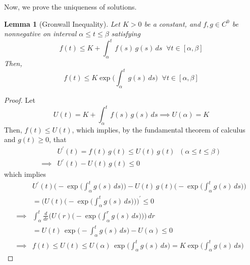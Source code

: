 \documentclass{article}
\newtheorem{lemma}[theorem]{Lemma}
\theoremstyle{remark}
\theoremstyle{definition}
\begin{document}
Now, we prove the uniqueness of solutions. 
\begin{lemma}[Gronwall Inequality]
Let $K > 0$ be a constant, and $f, g \in C^0$ be nonnegative on interval $\alpha \leq t \leq \beta$ satisfying 
\[f(t) \leq K + \int_\alpha^t f(s)\,g(s) \,ds \;\; \forall t \in [\alpha, \beta]\]
Then, 
\[f(t) \leq K \exp \bigg( \int_{\alpha}^t g(s) \,ds \bigg) \;\; \forall t \in [\alpha, \beta]\]
\end{lemma}
\begin{proof}
Let 
\[U(t) = K + \int_\alpha^t f(s) \, g(s) \, ds \implies U (\alpha) = K\]
Then, $f(t) \leq U(t)$, which implies, by the fundamental theorem of calculus and $g(t) \geq 0$, that 
\begin{align*}
    & U^\prime (t) = f(t)\,g(t) \leq U(t) \, g(t) \;\; (\alpha \leq t \leq \beta) \\
    \implies & U^\prime (t) - U(t) \, g(t) \leq 0
\end{align*}
which implies
\begin{align*}
    & U^\prime (t) \bigg( - \exp \Big( \int_\alpha^t g(s) \, ds \Big)\bigg) - U(t) \, g(t) \bigg( - \exp \Big( \int_\alpha^t g(s) \, ds \Big)\bigg) \\
    & = \Bigg( U(t) \bigg( - \exp \Big( \int_\alpha^t g(s) \, ds \Big)\bigg) \Bigg)^\prime \leq 0 \\
    \implies & \int_\alpha^t \frac{d}{dr} \bigg( U(r) \bigg( - \exp \Big( \int_\alpha^r g(s) \, ds \Big)\bigg) \bigg) \,dr \\
    & = U(t) \, \exp \Big( -\int_\alpha^t g(s)\,ds \Big) - U(\alpha) \leq 0 \\
    \implies & f(t) \leq U(t) \leq U(\alpha) \, \exp \Big( \int_\alpha^t g(s)\,ds \Big) = K \exp \Big( \int_\alpha^t g(s) \, ds\Big) 
\end{align*}
\end{proof}
\end{document}

